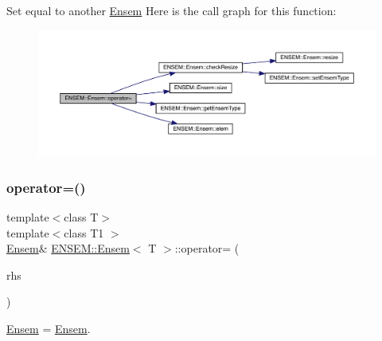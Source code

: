 Set equal to another \mbox{\hyperlink{classENSEM_1_1Ensem}{Ensem}} Here is the call graph for this function\+:
\nopagebreak
\begin{figure}[H]
\begin{center}
\leavevmode
\includegraphics[width=350pt]{d7/d3e/classENSEM_1_1Ensem_a2f4f881dde88dfaf425051580e477e6c_cgraph}
\end{center}
\end{figure}
\mbox{\label{classENSEM_1_1Ensem_a83f34607867df5f1fb9ad887354de48d}} 
\subsubsection{\texorpdfstring{operator=()}{operator=()}\hspace{0.1cm}{\footnotesize\ttfamily [9/10]}}
{\footnotesize\ttfamily template$<$class T$>$ \\
template$<$class T1 $>$ \\
\mbox{\hyperlink{classENSEM_1_1Ensem}{Ensem}}\& \mbox{\hyperlink{classENSEM_1_1Ensem}{E\+N\+S\+E\+M\+::\+Ensem}}$<$ T $>$\+::operator= (\begin{DoxyParamCaption}\item[{const \mbox{\hyperlink{classENSEM_1_1Ensem}{Ensem}}$<$ T1 $>$ \&}]{rhs }\end{DoxyParamCaption})\hspace{0.3cm}{\ttfamily [inline]}}



\mbox{\hyperlink{classENSEM_1_1Ensem}{Ensem}} = \mbox{\hyperlink{classENSEM_1_1Ensem}{Ensem}}. 

